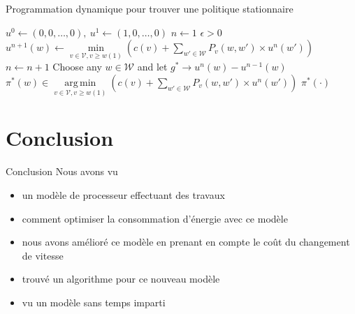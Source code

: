 \documentclass{beamer}
\DeclareMathOperator*{\argmin}{arg\,min}
\newcommand{\V}{\mathcal{V}}
\newcommand{\W}{\mathcal{W}}
\begin{document}
\begin{frame}
  \begin{algorithm}[H]
    \caption{Programmation dynamique pour trouver une politique stationnaire}
    \label{alg:inftyth}  
    \begin{algorithmic}
      \STATE $u^0\leftarrow (0,0,\dots,0),~u^1\leftarrow(1,0,\dots,0)$
      \STATE $n\leftarrow1$
      \STATE $\epsilon>0$
      \FORALL{$w\in\W$}
      \STATE $u^{n+1}(w)\leftarrow\min\limits_{v\in\V,v\geq
        w(1)}\left(c(v)+\sum\limits_{w'\in\W}P_v(w,w')\times u^n(w')\right)$
      \ENDFOR
      \STATE $n\leftarrow n+1$
      \ENDWHILE
      \STATE Choose any $w\in\W$ and let $g^*\rightarrow
      u^n(w)-u^{n-1}(w)$
      \FORALL{$w\in\W$}
      \STATE
      $\pi^*(w)\in\argmin\limits_{v\in\V,v\geq
        w(1)}\left(c(v)+\sum\limits_{w'\in\W}P_v(w,w')\times
        u^n(w')\right)$
      \ENDFOR
      \RETURN $\pi^*(\cdot)$
    \end{algorithmic}
  \end{algorithm}
\end{frame}

\section{Conclusion}

\begin{frame}{Conclusion}
  Nous avons vu
  \begin{itemize}
  \item un modèle de processeur effectuant des travaux
  \item comment optimiser la consommation d'énergie avec ce modèle
  \item nous avons amélioré ce modèle en prenant en compte le coût du
    changement de vitesse
  \item trouvé un algorithme pour ce nouveau modèle
  \item vu un modèle sans temps imparti
  \end{itemize}
\end{frame}
\end{document}
